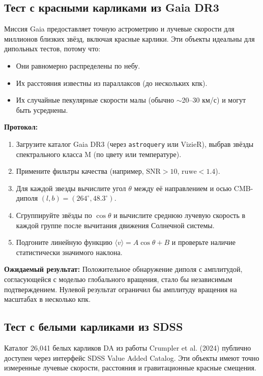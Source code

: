 \documentclass[11pt,a4paper]{article}
\begin{document}
	\subsection{Тест с красными карликами из Gaia DR3}
	
	Миссия Gaia предоставляет точную астрометрию и лучевые скорости для миллионов близких звёзд, включая красные карлики. Эти объекты идеальны для дипольных тестов, потому что:
	\begin{itemize}
		\item Они равномерно распределены по небу.
		\item Их расстояния известны из параллаксов (до нескольких кпк).
		\item Их случайные пекулярные скорости малы (обычно \(\sim\)20–30 км/с) и могут быть усреднены.
	\end{itemize}
	
	\textbf{Протокол:}
	\begin{enumerate}
		\item Загрузите каталог Gaia DR3 (через \texttt{astroquery} или VizieR), выбрав звёзды спектрального класса M (по цвету или температуре).
		\item Примените фильтры качества (например, \(\mathrm{SNR} > 10\), \(\mathrm{ruwe} < 1.4\)).
		\item Для каждой звезды вычислите угол \(\theta\) между её направлением и осью CMB-диполя \((l,b) = (264^\circ, 48.3^\circ)\).
		\item Сгруппируйте звёзды по \(\cos\theta\) и вычислите среднюю лучевую скорость в каждой группе после вычитания движения Солнечной системы.
		\item Подгоните линейную функцию \(\langle v \rangle = A \cos\theta + B\) и проверьте наличие статистически значимого наклона.
	\end{enumerate}
	
	\textbf{Ожидаемый результат:} Положительное обнаружение диполя с амплитудой, согласующейся с моделью глобального вращения, стало бы независимым подтверждением. Нулевой результат ограничил бы амплитуду вращения на масштабах в несколько кпк.
	
	\subsection{Тест с белыми карликами из SDSS}
	
	Каталог 26,041 белых карликов DA из работы Crumpler et al. (2024) публично доступен через интерфейс SDSS Value Added Catalog. Эти объекты имеют точно измеренные лучевые скорости, расстояния и гравитационные красные смещения.
	
\end{document}
